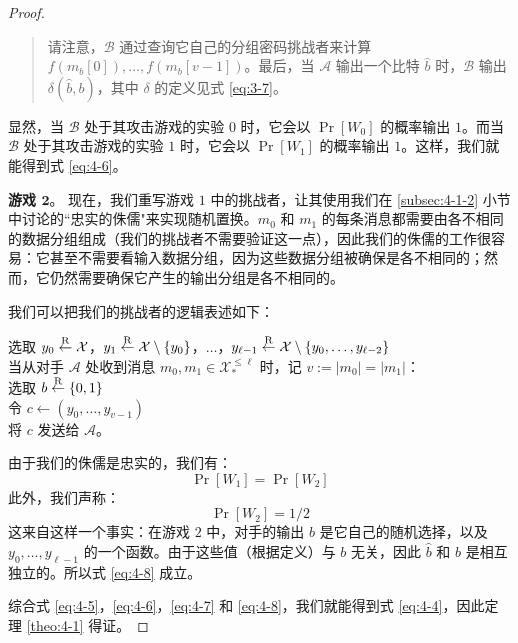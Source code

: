 \begin{proof}
\begin{quote}
\vspace*{5pt}

请注意，$\mathcal{B}$ 通过查询它自己的分组密码挑战者来计算 $f(m_b[0]),\dots,f(m_b[v-1])$。最后，当 $\mathcal{A}$ 输出一个比特 $\hat b$ 时，$\mathcal{B}$ 输出 $\delta(\hat b,b)$，其中 $\delta$ 的定义见式 \ref{eq:3-7}。
\end{quote}

\vspace{8pt}

\noindent
显然，当 $\mathcal{B}$ 处于其攻击游戏的实验 $0$ 时，它会以 $\Pr[W_0]$ 的概率输出 $1$。而当 $\mathcal{B}$ 处于其攻击游戏的实验 $1$ 时，它会以 $\Pr[W_1]$ 的概率输出 $1$。这样，我们就能得到式 \ref{eq:4-6}。

\vspace{8pt}

\noindent
\textbf{游戏 $\mathbf{2}$}。
现在，我们重写游戏 $1$ 中的挑战者，让其使用我们在 \ref{subsec:4-1-2} 小节中讨论的``忠实的侏儒"来实现随机置换。$m_0$ 和 $m_1$ 的每条消息都需要由各不相同的数据分组组成（我们的挑战者不需要验证这一点），因此我们的侏儒的工作很容易：它甚至不需要看输入数据分组，因为这些数据分组被确保是各不相同的；然而，它仍然需要确保它产生的输出分组是各不相同的。

我们可以把我们的挑战者的逻辑表述如下：

\vspace*{10pt}

\hspace*{5pt} 选取 $y_0\overset{\rm R}\leftarrow\mathcal{X}$，$y_1\overset{\rm R}\leftarrow\mathcal{X}\setminus\{y_0\}$，$\dots$，$y_{\ell-1}\overset{\rm R}\leftarrow\mathcal{X}\setminus\{y_0,\dots,y_{\ell-2}\}$\\
\hspace*{26pt} 当从对手 $\mathcal{A}$ 处收到消息 $m_0,m_1\in\mathcal{X}_*^{\leq\ell}$ 时，记 $v:=|m_0|=|m_1|$：\\
\hspace*{50pt} 选取 $b\overset{\rm R}\leftarrow\{0,1\}$\\
\hspace*{50pt} 令 $c\leftarrow(y_0,\dots,y_{v-1})$\\
\hspace*{50pt} 将 $c$ 发送给 $\mathcal{A}$。

\vspace*{10pt}

由于我们的侏儒是忠实的，我们有：
\begin{equation}\label{eq:4-7}
\Pr[W_1]=\Pr[W_2]
\end{equation}
此外，我们声称：
\begin{equation}\label{eq:4-8}
\Pr[W_2]={1}/{2}
\end{equation}
这来自这样一个事实：在游戏 $2$ 中，对手的输出 $\hat b$ 是它自己的随机选择，以及 $y_0,\dots,y_{\ell-1}$ 的一个函数。由于这些值（根据定义）与 $b$ 无关，因此 $\hat b$ 和 $b$ 是相互独立的。所以式 \ref{eq:4-8} 成立。

综合式 \ref{eq:4-5}，\ref{eq:4-6}，\ref{eq:4-7} 和 \ref{eq:4-8}，我们就能得到式 \ref{eq:4-4}，因此定理 \ref{theo:4-1} 得证。
\end{proof}

